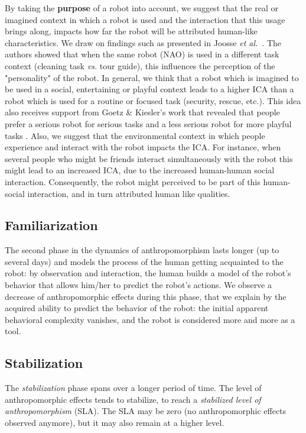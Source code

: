 \documentclass{sig-alternate-2013}
\begin{document}
By taking the \textbf{purpose} of a robot into account, we suggest that the real or imagined context in which a
robot is used and the interaction that this usage brings along, impacts how far the
robot will be attributed human-like characteristics. We draw on findings such
as presented in Joosse \textit{et al.}~\cite{joosse_what_2013}. The authors showed
that when the same robot (NAO) is used in a different task context (cleaning
task \textit{vs.} tour guide), this influences the perception of the
"personality" of the robot. In general, we think that a robot which is imagined
to be used in a social, entertaining or playful context leads to a higher ICA
than a robot which is used for a routine or focused task (security, rescue, etc.). This
idea also receives support from Goetz \& Kiesler's work that revealed
that people prefer a serious robot for serious tasks and a less serious robot
for more playful tasks \cite{goetz_cooperation_2002, goetz_matching_2003}. Also, we suggest that the environmental
context in which people experience and interact with the robot impacts the ICA.
For instance, when several people who might be friends interact simultaneously with the robot
this might lead to an increased ICA, due to the increased human-human social interaction. Consequently, the robot might perceived to be part of this human-social interaction, and in turn attributed human like qualities.

\subsection*{Familiarization} The second phase in the dynamics of anthropomorphism
 lasts longer (up to several days)
and models the process of the human getting acquainted to the robot: by
observation and interaction, the human builds a model of the robot's behavior
that allows him/her to predict the robot's actions. We observe a decrease of
anthropomorphic effects during this phase, that we explain by the acquired
ability to predict the behavior of the robot: the initial apparent behavioral
complexity vanishes, and the robot is considered more and more as a tool.

\subsection*{Stabilization} The \emph{stabilization} phase spans over a longer
period of time. The level of anthropomorphic effects tends to stabilize, to
reach a \emph{stabilized level of anthropomorphism} (SLA). The SLA may be zero
(no anthropomorphic effects observed anymore), but it may also remain at a
higher level.
\end{document}
